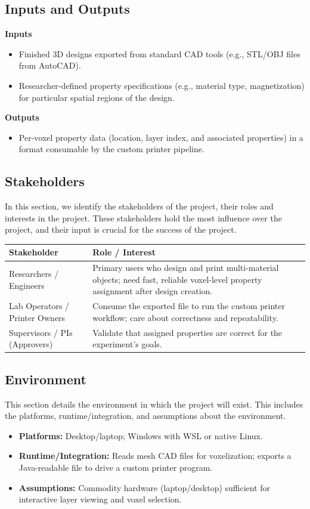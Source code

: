 \documentclass{article}
\begin{document}
\subsection{Inputs and Outputs}
\textbf{Inputs}
\begin{itemize}
  \item Finished 3D designs exported from standard CAD tools (e.g., STL/OBJ files from AutoCAD).
  \item Researcher-defined property specifications (e.g., material type, magnetization) for particular spatial regions of the design.
\end{itemize}

\noindent\textbf{Outputs}
\begin{itemize}
  \item Per-voxel property data (location, layer index, and associated properties) in a format consumable by the custom printer pipeline.
\end{itemize}


\subsection{Stakeholders}

In this section, we identify the stakeholders of the project, their roles and interests in the project. These stakeholders hold the most influence over the project, and their input is crucial for the success of the project.

\begin{tabularx}{\textwidth}{lX}
\toprule
\textbf{Stakeholder} & \textbf{Role / Interest}\\
\midrule
Researchers / Engineers & Primary users who design and print multi-material objects; need fast, reliable voxel-level property assignment after design creation.\\
Lab Operators / Printer Owners & Consume the exported file to run the custom printer workflow; care about correctness and repeatability.\\
Supervisors / PIs (Approvers) & Validate that assigned properties are correct for the experiment’s goals.\\
\bottomrule
\end{tabularx}
\subsection{Environment}

This section details the environment in which the project will exist. This includes the platforms, runtime/integration, and assumptions about the environment.
\begin{itemize}
  \item \textbf{Platforms:} Desktop/laptop; Windows with WSL or native Linux.
  \item \textbf{Runtime/Integration:} Reads mesh CAD files for voxelization; exports a Java-readable file to drive a custom printer program.
  \item \textbf{Assumptions:} Commodity hardware (laptop/desktop) sufficient for interactive layer viewing and voxel selection.
\end{itemize}
\end{document}
